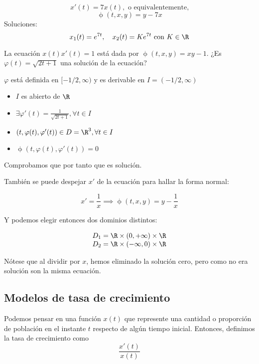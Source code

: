 \begin{ejemplo}

\[ x'(t) = 7x(t), \text{ o equivalentemente,}\]
\[ \upphi(t,x,y) = y - 7x \]
Soluciones:
\[ x_1(t) = e^{7t}, \quad  x_2(t) = Ke^{7t} \text{ con } K \in \R \] 

\end{ejemplo}


\begin{ejemplo}
La ecuación $x(t)x'(t) = 1$ está dada por $\upphi(t,x,y) = xy - 1$. ¿Es $\varphi(t) = \sqrt{2t+1}$ una solución de la ecuación?

$\varphi$ está definida en $[-1/2, \infty)$ y es derivable en $I = (-1/2, \infty)$

\begin{itemize}
\item $I$ es abierto de $\R$
\item $\exists \varphi'(t) = \frac{1}{\sqrt{2t+1}}, \forall t \in I$
\item $(t, \varphi(t), \varphi'(t)) \in D = \R^3, \forall t \in I$
\item $\upphi\left(t, \varphi(t), \varphi'(t)\right) = 0$
\end{itemize}

Comprobamos que por tanto que es solución.

También se puede despejar $x'$ de la ecuación para hallar la forma normal:

\[ x' = \frac{1}{x} \implies \upphi(t, x, y) = y-\frac{1}{x} \]

Y podemos elegir entonces dos dominios distintos:

\[ 
\begin{array}{l}
  D_1 = \R \times (0,+\infty )\times \R \\
  D_2 = \R \times (-\infty ,0)\times \R
\end{array}
\]

Nótese que al dividir por $x$, hemos eliminado la solución cero, pero como no era solución son la misma ecuación.


\end{ejemplo}

\subsection{Modelos de tasa de crecimiento}

Podemos pensar en una función $x(t)$ que represente una cantidad o proporción de población en el instante $t$ respecto de algún tiempo inicial. Entonces, definimos la tasa de crecimiento como
\[
\frac{x'(t)}{x(t)}
\]

